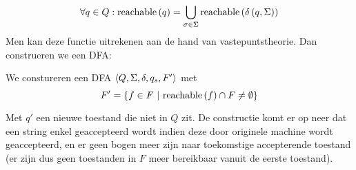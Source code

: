 \documentclass[a4paper]{article}
\begin{document}
\begin{question}
\begin{answer}
\begin{enumerate}
\begin{equation}
  \forall q\in Q:\mbox{reachable}\left( q \right)=\displaystyle\bigcup_{\sigma\in\Sigma}{\mbox{reachable}\left( \delta\left( q,\Sigma \right) \right)}
 \end{equation}
 Men kan deze functie uitrekenen aan de hand van vastepuntstheorie. Dan construeren we een DFA:
 \begin{construction}
  We constureren een DFA $\left\langle Q,\Sigma,\delta,q_s,F' \right\rangle$ met
  \begin{equation}
  F'=\left\{ f\in F\ |\ \mbox{reachable}\left( f \right)\cap F\neq\emptyset \right\}
  \end{equation}
 \end{construction}
 Met $q'$ een nieuwe toestand die niet in $Q$ zit. De constructie komt er op neer dat een string enkel geaccepteerd wordt indien deze door originele machine wordt geaccepteerd, en er geen bogen meer zijn naar toekomstige accepterende toestand (er zijn dus geen toestanden in $F$ meer bereikbaar vanuit de eerste toestand).
\end{enumerate}
\end{answer}
\end{question}
\end{document}
